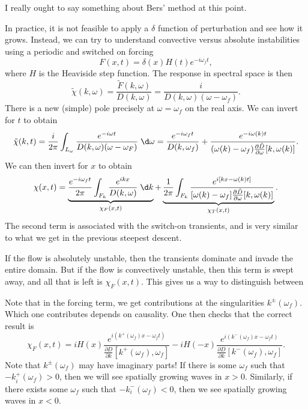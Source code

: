 \documentclass[a4paper]{article}
\begin{document}
I really ought to say something about Bers' method at this point.

%
%
%

In practice, it is not feasible to apply a $\delta$ function of perturbation and see how it grows. Instead, we can try to understand convective versus absolute instabilities using a periodic and switched on forcing
\[
  F(x, t) = \delta(x) H(t) e^{-i\omega_f t},
\]
where $H$ is the Heaviside step function. The response in spectral space is then
\[
  \tilde{\chi}(k, \omega) = \frac{\tilde{F}(k, \omega)}{D(k, \omega)} = \frac{i}{D(k, \omega)(\omega - \omega_f)}.
\]
There is a new (simple) pole precisely at $\omega = \omega_f$ on the real axis. We can invert for $t$ to obtain
\[
  \tilde{\chi}(k, t) = \frac{i}{2\pi} \int_{L_\omega} \frac{e^{-i\omega t}}{D(k, \omega) (\omega - \omega_F)}\;\d \omega = \frac{e^{-i\omega_f t}}{D(k, \omega_f)} + \frac{e^{-i\omega(k) t}}{(\omega(k) - \omega_f) \frac{\partial \tilde{D}}{\partial \omega}[k, \omega(k)]}.
\]
We can then invert for $x$ to obtain
\[
  \chi(x, t) = \underbrace{\frac{e^{-i\omega_f t}}{2\pi} \int_{F_k} \frac{e^{ikx}}{D(k, \omega)}\;\d k}_{\chi_F(x, t)} + \underbrace{\frac{1}{2\pi} \int_{F_k} \frac{e^{i[kx - \omega(k) t]}}{[\omega(k) - \omega_f] \frac{\partial \tilde{D}}{\partial \omega} [k, \omega(k)]}}_{\chi_T(x, t)}.
\]
The second term is associated with the switch-on transients, and is very similar to what we get in the previous steepest descent.

If the flow is absolutely unstable, then the transients dominate and invade the entire domain. But if the flow is convectively unstable, then this term is swept away, and all that is left is $\chi_F(x, t)$. This gives us a way to distinguish between

Note that in the forcing term, we get contributions at the singularities $k^{\pm}(\omega_f)$. Which one contributes depends on causality. One then checks that the correct result is
\[
  \chi_F(x, t) = iH(x) \frac{e^{i(k^+(\omega_f)x - \omega_f t)}}{\frac{\partial D}{\partial k} [k^+(\omega_f), \omega_f]} - i H(-x) \frac{e^{i(k^-(\omega_f) x - \omega_f t)}}{\frac{\partial D}{\partial k} [k^-(\omega_f), \omega_f]}.
\]
Note that $k^{\pm}(\omega_f)$ may have imaginary parts! If there is some $\omega_f$ such that $-k_i^+(\omega_f) > 0$, then we will see spatially growing waves in $x > 0$. Similarly, if there exists some $\omega_f$ such that $-k_i^-(\omega_f) < 0$, then we see spatially growing waves in $x < 0$.
\end{document}
